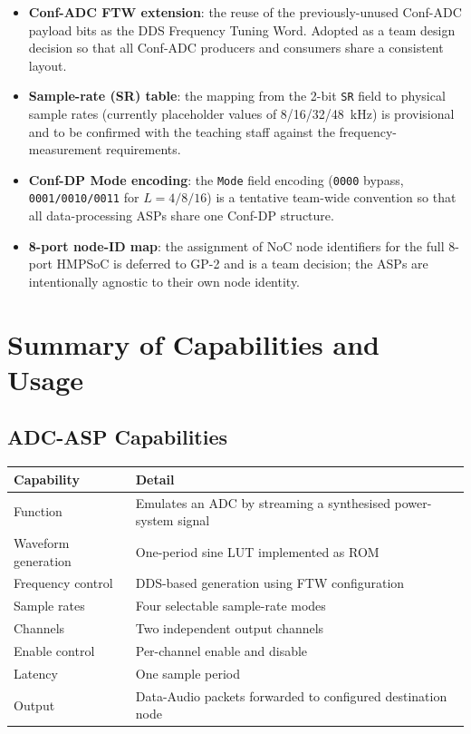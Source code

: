 \documentclass[10pt, a4paper]{article}
\begin{document}
\begin{itemize}
    \item \textbf{Conf-ADC FTW extension}: the reuse of the previously-unused Conf-ADC payload bits as the DDS Frequency Tuning Word. Adopted as a team design decision so that all Conf-ADC producers and consumers share a consistent layout.
    \item \textbf{Sample-rate (SR) table}: the mapping from the 2-bit \texttt{SR} field to physical sample rates (currently placeholder values of 8/16/32/48~kHz) is provisional and to be confirmed with the teaching staff against the frequency-measurement requirements.
    \item \textbf{Conf-DP Mode encoding}: the \texttt{Mode} field encoding (\texttt{0000} bypass, \texttt{0001/0010/0011} for $L=4/8/16$) is a tentative team-wide convention so that all data-processing ASPs share one Conf-DP structure.
    \item \textbf{8-port node-ID map}: the assignment of NoC node identifiers for the full 8-port HMPSoC is deferred to GP-2 and is a team decision; the ASPs are intentionally agnostic to their own node identity.
\end{itemize}

\section{Summary of Capabilities and Usage}
\label{sec:capabilities}

\subsection{ADC-ASP Capabilities}

\begin{center}
\begin{tabular}{|p{4cm}|p{9cm}|}
    \hline
    \textbf{Capability}     & \textbf{Detail} \\ \hline
    Function                & Emulates an ADC by streaming a synthesised power-system signal \\ \hline
    Waveform generation     & One-period sine LUT implemented as ROM \\ \hline
    Frequency control       & DDS-based generation using FTW configuration \\ \hline
    Sample rates            & Four selectable sample-rate modes \\ \hline
    Channels                & Two independent output channels \\ \hline
    Enable control          & Per-channel enable and disable \\ \hline
    Latency                 & One sample period \\ \hline
    Output                  & Data-Audio packets forwarded to configured destination node \\ \hline
\end{tabular}
\end{center}
\end{document}

